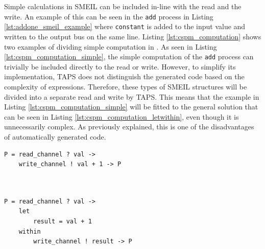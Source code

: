 Simple calculations in SMEIL can be included in-line with the read and the write. An example of this can be seen in the \texttt{add} process in Listing \ref{lst:addone_smeil_example} where \texttt{constant} is added to the input value and written to the output bus on the same line.
Listing \ref{lst:cspm_computation} shows two examples of dividing simple computation in \cspm{}.
As seen in Listing \ref{lst:cspm_computation_simple}, the simple computation of the \texttt{add} process can trivially be included directly to the read or write.
However, to simplify its implementation, TAPS does not distinguish the generated code based on the complexity of expressions.
Therefore, these types of SMEIL structures will be divided into a separate read and write by TAPS.
This means that the example in Listing \ref{lst:cspm_computation_simple} will be fitted to the general solution that can be seen in Listing \ref{lst:cspm_computation_letwithin}, even though it is unnecessarily complex. As previously explained, this is one of the disadvantages of automatically generated code.\\
\begin{minipage}[t]{.98\linewidth}
    \centering
\begin{minipage}[t]{0.45\linewidth}
\begin{verbatim}
P = read_channel ? val ->
    write_channel ! val + 1 -> P



\end{verbatim}
  \label{lst:cspm_computation_simple}
\end{minipage}
\hspace{0.6cm}
\begin{minipage}[t]{0.45\linewidth}
\begin{verbatim}
P = read_channel ? val ->
    let
        result = val + 1
    within
        write_channel ! result -> P
\end{verbatim}
\label{lst:cspm_computation_letwithin}
\end{minipage}
\vspace{0.3cm}
\label{lst:cspm_computation}
\vspace{1cm}
\end{minipage}
